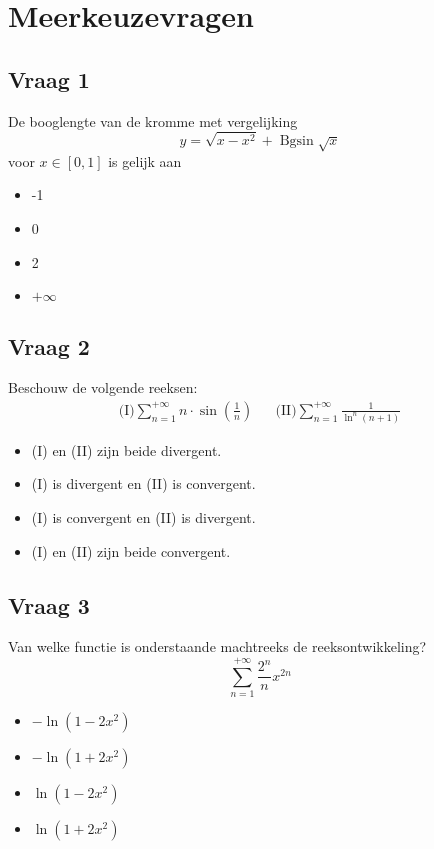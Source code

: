 \documentclass[kulak]{kulakarticle} %
\DeclareMathOperator{\Bgsin}{Bgsin}
\begin{document}
	\section*{Meerkeuzevragen}

	\subsection*{Vraag 1}

	De booglengte van de kromme met vergelijking \[ y=\sqrt{x-x^2} + \Bgsin \sqrt{x} \] voor \(x\in[0,1]\) is gelijk aan
	\begin{itemize}
		\item -1
		\item 0
		\item 2
		\item \(+\infty\)
	\end{itemize}

	\subsection*{Vraag 2}

	Beschouw de volgende reeksen:
	\begin{align*}
		\text{(I)} \sum_{n=1}^{+\infty}n\cdot\sin{\left(\frac{1}{n}\right)} && \text{(II)} \sum_{n=1}^{+\infty} \frac{1}{\ln^n(n+1)}
	\end{align*}

	\begin{itemize}
		\item (I) en (II) zijn beide divergent.
		\item (I) is divergent en (II) is convergent.
		\item (I) is convergent en (II) is divergent.
		\item (I) en (II) zijn beide convergent.
	\end{itemize}

	\subsection*{Vraag 3}

	Van welke functie is onderstaande machtreeks de reeksontwikkeling? \[ \sum_{n=1}^{+\infty}\frac{2^n}{n}x^{2n} \]

	\begin{itemize}
		\item \( -\ln{(1-2x^2)} \)
		\item \( -\ln{(1+2x^2)} \)
		\item \( \ln{(1-2x^2)} \)
		\item \( \ln{(1+2x^2)} \)
	\end{itemize}
\end{document}

